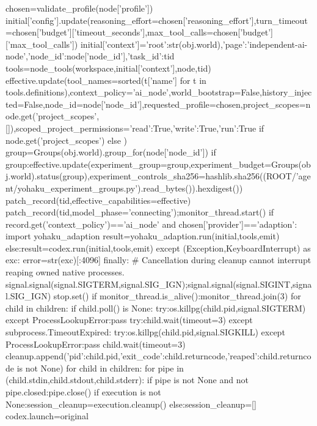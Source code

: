             chosen=validate_profile(node['profile'])
            initial['config'].update(reasoning_effort=chosen['reasoning_effort'],turn_timeout=chosen['budget']['timeout_seconds'],max_tool_calls=chosen['budget']['max_tool_calls'])
            initial['context']={'root':str(obj.world),'page':'independent-ai-node','node_id':node['node_id'],'task_id':tid}
            tools=node_tools(workspace,initial['context'],node,tid)
            effective.update(tool_names=sorted(t['name'] for t in tools.definitions),context_policy='ai_node',world_bootstrap=False,history_injected=False,node_id=node['node_id'],requested_profile=chosen,project_scopes=node.get('project_scopes',[]),scoped_project_permissions={'read':True,'write':True,'run':True} if node.get('project_scopes') else {})
            group=Groups(obj.world).group_for(node['node_id'])
            if group:effective.update(experiment_group=group,experiment_budget=Groups(obj.world).status(group),experiment_controls_sha256=hashlib.sha256((ROOT/'agent/yohaku_experiment_groups.py').read_bytes()).hexdigest())
            patch_record(tid,effective_capabilities=effective)
        patch_record(tid,model_phase='connecting');monitor_thread.start()
        if record.get('context_policy')=='ai_node' and chosen['provider']=='adaption':
            import yohaku_adaption
            result=yohaku_adaption.run(initial,tools,emit)
        else:result=codex.run(initial,tools,emit)
    except (Exception,KeyboardInterrupt) as exc:
        error=str(exc)[:4096]
    finally:
        # Cancellation during cleanup cannot interrupt reaping owned native processes.
        signal.signal(signal.SIGTERM,signal.SIG_IGN);signal.signal(signal.SIGINT,signal.SIG_IGN)
        stop.set()
        if monitor_thread.is_alive():monitor_thread.join(3)
        for child in children:
            if child.poll() is None:
                try:os.killpg(child.pid,signal.SIGTERM)
                except ProcessLookupError:pass
                try:child.wait(timeout=3)
                except subprocess.TimeoutExpired:
                    try:os.killpg(child.pid,signal.SIGKILL)
                    except ProcessLookupError:pass
                    child.wait(timeout=3)
            cleanup.append({'pid':child.pid,'exit_code':child.returncode,'reaped':child.returncode is not None})
        for child in children:
            for pipe in (child.stdin,child.stdout,child.stderr):
                if pipe is not None and not pipe.closed:pipe.close()
        if execution is not None:session_cleanup=execution.cleanup()
        else:session_cleanup=[]
        codex.launch=original
